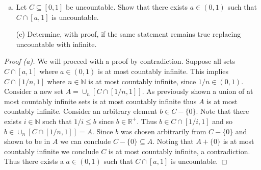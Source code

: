 \documentclass[12pt]{article}
\makeatletter
\theoremstyle{homework}
\newenvironment{exercise}[1]
{\def\@currentlabel{#1}\exercisecore}
{\endexercisecore}
\makeatother
\begin{document}
\begin{exercise}{1.5.10 (a) (c)}\noindent\par

\begin{enumerate}[(a)]
\item Let $C\subseteq[0,1]$ be uncountable.  Show that
there exists $a\in(0,1)$ such that $C\cap [a,1]$ is uncountable.
\item[(c)] Determine, with proof, if the same statement remains
true replacing uncountable with infinite.
\end{enumerate}
\end{exercise}
\begin{proof}[Proof (a)]
We will proceed with a proof by contradiction.  Suppose all sets $C\cap [a,1]$ where $a\in (0,1)$ is at most countably infinite.  This implies $C\cap [1/n,1]$ where $n\in \mathbb{N}$ is at most countably infinite, since $1/n\in (0,1)$.  Consider a new set $A=\cup_n [C\cap [1/n,1]]$.  As previously shown a union of at most countably infinite sets is at most countably infinite thus $A$ is at most countably infinite.  Consider an arbitrary element $b\in C-\{0\}$.  Note that there exists $i\in\mathbb{N}$ such that $1/i\leq b$ since $b\in\mathbb{R}^+$.  Thus $b\in C\cap [1/i,1]$ and so $b\in \cup_n [C\cap [1/n,1]]=A$.  Since $b$ was chosen arbitrarily from $C-\{0\}$ and shown to be in $A$ we can conclude $C-\{0\}\subseteq A$.  Noting that $A+\{0\}$ is at most countably infinite we conclude $C$ is at most countably infinite, a contradiction.  Thus there exists a $a\in (0,1)$ such that $C\cap [a,1]$ is uncountable.
\end{proof}
\end{document}
